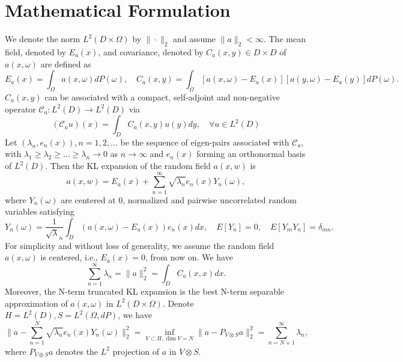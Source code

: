 \documentclass[11pt]{amsart}
\newcommand{\w}{\omega}
\newcommand{\W}{\Omega}
\newcommand{\cC}{\mathcal{C}}
\begin{document}
\section{Mathematical Formulation}
\label{sec:formulation}
We denote the norm $L^2(D\times \W)$ by $\|\cdot\|_2$ and assume $\|a\|_2<\infty$. The mean field, denoted by $E_a(x)$,  and covariance, denoted by $C_a(x,y)\in D\times D$ of $a(x,\w)$ are defined as 
\begin{equation}
\label{eq:mean}
E_a(x)=\int_{\W}a(x,\w)dP(\w), \quad C_a(x,y)=\int_{\W}[a(x,\w)-E_a(x)][a(y,\w)-E_a(y)]dP(\w). 
\end{equation}
$C_a(x,y)$ can be associated with a compact, self-adjoint and non-negative operator $\cC_a: L^2(D)\rightarrow L^2(D)$ via
\begin{equation}
\label{eq:operator}
(\cC_a u)(x)=\int_D C_a(x,y)u(y)dy, \quad \forall u\in L^2 (D)
\end{equation}
Let $(\lambda_n, e_n(x)), n=1, 2, \ldots$ be the sequence of eigen-pairs associated with $\cC_a$, with $\lambda_1\ge \lambda_2 \ge \ldots \ge \lambda_n \rightarrow 0$ as $n\rightarrow \infty$ and $e_n(x)$ forming an orthonormal basis of $L^2(D)$. Then the KL expansion of the random field $a(x,w)$ is
\begin{equation}
\label{eq:KL}
a(x,w)=E_a(x)+ \sum_{n=1}^{\infty}\sqrt{\lambda_n}e_n(x)Y_n(\w),
\end{equation}
where $Y_n(\w)$ are centered at 0, normalized and pairwise uncorrelated random variables satisfying
\begin{equation}
Y_n(\w)=\frac{1}{\sqrt\lambda_n}\int_D (a(x,\w)-E_a(x))e_n(x)dx, \quad E[Y_n]=0, \quad E[Y_mY_n]=\delta_{mn}.
\end{equation}
For simplicity and without loss of generality, we assume the random field $a(x,\w)$ is centered, i.e.,  $E_a(x)=0$, from now on. We have 
\begin{equation}
\label{eq:trace}
\sum_{n=1}^{\infty}\lambda_n=\|a\|^2_2=\int_D C_a(x,x) dx.
\end{equation}
Moreover, the N-term truncated KL expansion is the best N-term separable approximation of $a(x,\w)$ in $L^2(D\times \W)$. Denote $H=L^2(D), S=L^2(\W,dP)$, we have 
\begin{equation}
\label{eq:truncated}
\|a-\sum_{n=1}^{N}\sqrt{\lambda_n}e_n(x)Y_n(\w)\|^2_2=\inf_{V\subset H, \dim V=N} \|a-P_{V\otimes S}a\|^2_2=\sum_{n=N+1}^{\infty}\lambda_n,
\end{equation}
where $P_{V\otimes S}a$ denotes the $L^2$ projection of $a$ in $V\otimes S$.
\end{document}
